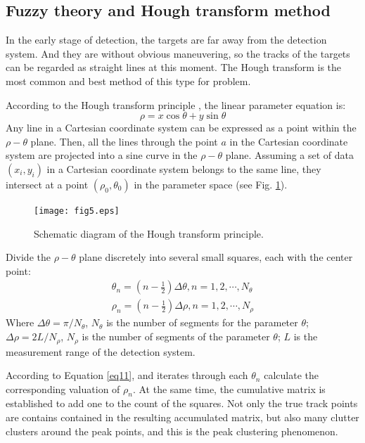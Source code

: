 \documentclass[default,iicol]{sn-jnl}%
\theoremstyle{thmstyleone}%
\theoremstyle{thmstyletwo}%
\theoremstyle{thmstylethree}%
\begin{document}
\subsection{Fuzzy theory and Hough transform method}\label{subsec3}

In the early stage of detection, the targets are far away from the detection system. And they are without obvious maneuvering, so the tracks of the targets can be regarded as straight lines at this moment. The Hough transform is the most common and best method of this type for problem.

According to the Hough transform principle \cite{bib18}, the linear parameter equation is:
\begin{equation}
    \rho = x \cos \theta + y \sin \theta
    \label{eq11}
\end{equation}
Any line in a Cartesian coordinate system can be expressed as a point within the $\rho-\theta$ plane. Then, all the lines through the point $a$ in the Cartesian coordinate system are projected into a sine curve in the $\rho-\theta$ plane. Assuming a set of data $( x _ { i } , y _ { i } )$ in a Cartesian coordinate system belongs to the same line, they intersect at a point $( \rho _ { 0 } , \theta _ { 0 } )$ in the parameter space (see Fig. \ref{fig5}).
\begin{figure}[b]%
    \centering
    \texttt{[image: fig5.eps]}
    \caption{Schematic diagram of the Hough transform principle.}\label{fig5}
\end{figure}

Divide the $\rho-\theta$ plane discretely into several small squares, each with the center point:
\begin{equation}
    \left. \begin{array}  { l  }  { \theta _ { n } = ( n - \frac { 1 } { 2 } ) \varDelta \theta , n = 1 , 2 , \cdots , N _ { \theta } } \\ { \rho _ { n } = ( n - \frac { 1 } { 2 } ) \varDelta \rho , n = 1 , 2 , \cdots , N _ { \rho } } \end{array} \right.
    \label{eq12}
\end{equation}
Where $\varDelta \theta = \pi / N _ { \theta }$, $ N _ { \theta }$ is the number of segments for the parameter $\theta$; $\varDelta \rho = 2 L / N _ {  \rho }$, $N _ {  \rho }$ is the number of segments of the parameter $\theta$; $L$ is the measurement range of the detection system.

According to Equation \ref{eq11}, and iterates through each $\theta _ { n }$ calculate the corresponding valuation of $\rho _ { n }$. At the same time, the cumulative matrix is established to add one to the count of the squares. Not only the true track points are contains contained in the resulting accumulated matrix, but also many clutter clusters around the peak points, and this is the peak clustering phenomenon.
\end{document}
